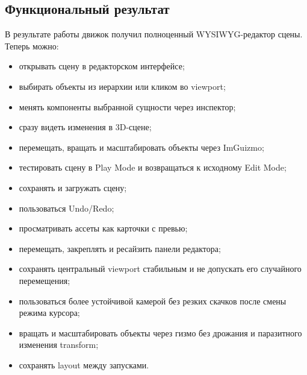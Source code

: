 \documentclass[a4paper,14pt]{extarticle}
\begin{document}
\subsection{Функциональный результат}
В результате работы движок получил полноценный WYSIWYG-редактор сцены. Теперь можно:
\begin{itemize}
  \item открывать сцену в редакторском интерфейсе;
  \item выбирать объекты из иерархии или кликом во viewport;
  \item менять компоненты выбранной сущности через инспектор;
  \item сразу видеть изменения в 3D-сцене;
  \item перемещать, вращать и масштабировать объекты через ImGuizmo;
  \item тестировать сцену в Play Mode и возвращаться к исходному Edit Mode;
  \item сохранять и загружать сцену;
  \item пользоваться Undo/Redo;
  \item просматривать ассеты как карточки с превью;
  \item перемещать, закреплять и ресайзить панели редактора;
  \item сохранять центральный viewport стабильным и не допускать его случайного перемещения;
  \item пользоваться более устойчивой камерой без резких скачков после смены режима курсора;
  \item вращать и масштабировать объекты через гизмо без дрожания и паразитного изменения transform;
  \item сохранять layout между запусками.
\end{itemize}
\end{document}
